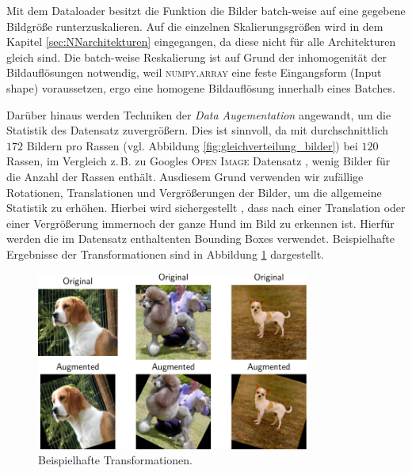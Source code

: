 Mit dem Dataloader besitzt die Funktion die Bilder batch-weise auf eine gegebene
Bildgröße runterzuskalieren. Auf die einzelnen Skalierungsgrößen wird in dem
Kapitel \ref{sec:NNarchitekturen} eingegangen, da diese nicht für alle Architekturen
gleich sind. Die batch-weise Reskalierung ist auf Grund der inhomogenität
der Bildauflösungen notwendig, weil \textsc{numpy.array}
eine feste Eingangsform (Input shape) voraussetzen, ergo eine homogene Bildauflösung
innerhalb eines Batches.

Darüber hinaus werden Techniken der \emph{Data Augementation} angewandt, um
die Statistik des Datensatz zuvergrößern. Dies ist sinnvoll, da mit durchschnittlich
$172$ Bildern pro Rassen (vgl. Abbildung \ref{fig:gleichverteilung_bilder})
bei $120$ Rassen, im Vergleich z.\,B. zu Googles \textsc{Open Image} Datensatz
\cite{google_open_image}, wenig Bilder für die Anzahl der Rassen enthält.
Ausdiesem Grund verwenden wir zufällige Rotationen, Translationen und Vergrößerungen
der Bilder, um die allgemeine Statistik zu erhöhen. Hierbei wird sichergestellt
, dass nach einer Translation oder einer Vergrößerung immernoch der ganze Hund
im Bild zu erkennen ist. Hierfür werden die im Datensatz enthaltenten Bounding
Boxes verwendet. Beispielhafte Ergebnisse der Transformationen sind in Abbildung
\ref{fig:data_augementation} dargestellt.
\begin{figure}
\centering
\includegraphics[width=0.8\textwidth]{../../final_data/general/data_augementation.pdf}
\caption{Beispielhafte Transformationen.}
\label{fig:data_augementation}
\end{figure}


